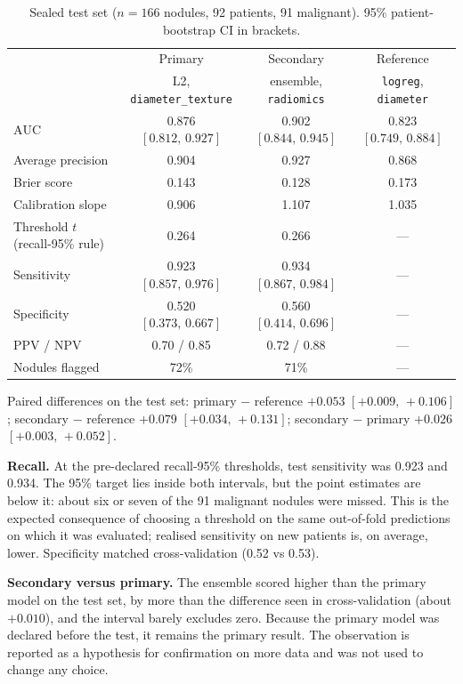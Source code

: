 \documentclass[journal]{IEEEtran}
\newcommand{\auc}{\mathrm{AUC}}
\newcommand{\ci}[2]{[#1,\,#2]}            %
\newcommand{\code}[1]{\texttt{#1}}
\begin{document}
\begin{table}[!t]
\caption{Sealed test set ($n=166$ nodules, 92 patients, 91 malignant). 95\% patient-bootstrap CI in brackets.}
\label{tab:test}
\centering\small
\begin{tabular}{lccc}
\toprule
 & Primary & Secondary & Reference\\
 & L2, \code{diameter\_texture} & ensemble, \code{radiomics} & \code{logreg}, \code{diameter}\\
\midrule
$\auc$             & 0.876 $\ci{0.812}{0.927}$ & 0.902 $\ci{0.844}{0.945}$ & 0.823 $\ci{0.749}{0.884}$\\
Average precision  & 0.904 & 0.927 & 0.868\\
Brier score        & 0.143 & 0.128 & 0.173\\
Calibration slope  & 0.906 & 1.107 & 1.035\\
\midrule
Threshold $t$ (recall-95\% rule) & 0.264 & 0.266 & ---\\
Sensitivity        & 0.923 $\ci{0.857}{0.976}$ & 0.934 $\ci{0.867}{0.984}$ & ---\\
Specificity        & 0.520 $\ci{0.373}{0.667}$ & 0.560 $\ci{0.414}{0.696}$ & ---\\
PPV / NPV          & 0.70 / 0.85 & 0.72 / 0.88 & ---\\
Nodules flagged    & 72\% & 71\% & ---\\
\bottomrule
\end{tabular}
\end{table}

Paired differences on the test set: primary $-$ reference $+0.053$ $\ci{+0.009}{+0.106}$; secondary $-$ reference
$+0.079$ $\ci{+0.034}{+0.131}$; secondary $-$ primary $+0.026$ $\ci{+0.003}{+0.052}$.

\textbf{Recall.} At the pre-declared recall-95\% thresholds, test sensitivity was 0.923 and 0.934. The 95\% target lies
inside both intervals, but the point estimates are below it: about six or seven of the 91 malignant nodules were missed.
This is the expected consequence of choosing a threshold on the same out-of-fold predictions on which it was
evaluated; realised sensitivity on new patients is, on average, lower. Specificity matched cross-validation (0.52 vs 0.53).

\textbf{Secondary versus primary.} The ensemble scored higher than the primary model on the test set, by more than the
difference seen in cross-validation (about $+0.010$), and the interval barely excludes zero. Because the primary model was
declared before the test, it remains the primary result. The observation is reported as a hypothesis for confirmation on
more data and was not used to change any choice.
\end{document}
